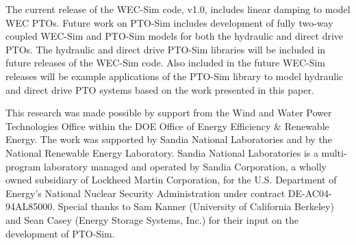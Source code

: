 \documentclass[twocolumn,10pt]{asme2e}
\begin{document}
The current release of the WEC-Sim code, v1.0, includes linear damping to model WEC PTOs. Future work on PTO-Sim includes development of fully two-way coupled WEC-Sim and PTO-Sim models for both the hydraulic and direct drive PTOs. The hydraulic and direct drive PTO-Sim libraries will be included in future releases of the WEC-Sim code. Also included in the future WEC-Sim releases will be example applications of the PTO-Sim library to model hydraulic and direct drive PTO systems based on the work presented in this paper.

\begin{acknowledgment}

This research was made possible by support from the Wind and Water Power Technologies Office within the DOE Office of Energy Efficiency \& Renewable Energy. The work was supported by Sandia National Laboratories and by the National Renewable Energy Laboratory. Sandia National Laboratories is a multi-program laboratory managed and operated by Sandia Corporation, a wholly owned subsidiary of Lockheed Martin Corporation, for the U.S. Department of Energy’s National Nuclear Security Administration under contract DE-AC04-94AL85000. Special thanks to Sam Kanner (University of California Berkeley) and Sean Casey (Energy Storage Systems, Inc.) for their input on the development of PTO-Sim.

\end{acknowledgment}




%



\end{document}
